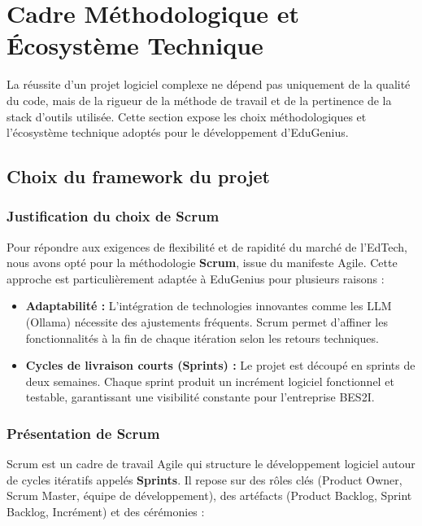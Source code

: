 \section{Cadre Méthodologique et Écosystème Technique}

La réussite d'un projet logiciel complexe ne dépend pas uniquement de la qualité du code, mais de la rigueur de la méthode de travail et de la pertinence de la stack d'outils utilisée. Cette section expose les choix méthodologiques et l'écosystème technique adoptés pour le développement d'EduGenius.

\subsection{Choix du framework du projet}

\subsubsection{Justification du choix de Scrum}
Pour répondre aux exigences de flexibilité et de rapidité du marché de l'EdTech, nous avons opté pour la méthodologie \textbf{Scrum}, issue du manifeste Agile. Cette approche est particulièrement adaptée à EduGenius pour plusieurs raisons :

\begin{itemize}
\item \textbf{Adaptabilité :} L'intégration de technologies innovantes comme les LLM (Ollama) nécessite des ajustements fréquents. Scrum permet d'affiner les fonctionnalités à la fin de chaque itération selon les retours techniques.
\item \textbf{Cycles de livraison courts (Sprints) :} Le projet est découpé en sprints de deux semaines. Chaque sprint produit un incrément logiciel fonctionnel et testable, garantissant une visibilité constante pour l'entreprise BES2I.
\end{itemize}

\subsubsection{Présentation de Scrum}
Scrum est un cadre de travail Agile qui structure le développement logiciel autour de cycles itératifs appelés \textbf{Sprints}. Il repose sur des rôles clés (Product Owner, Scrum Master, équipe de développement), des artéfacts (Product Backlog, Sprint Backlog, Incrément) et des cérémonies :


